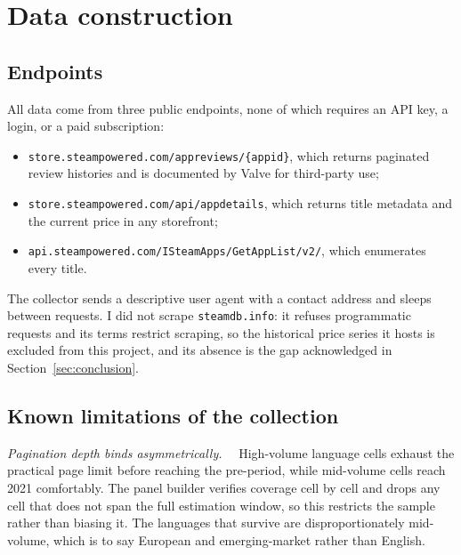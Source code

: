 \documentclass[11pt]{article}
\newcommand{\heading}[1]{\vspace{3pt}\noindent\textit{#1}\ \ }
\begin{document}
\section{Data construction}\label{app:data}

\subsection*{Endpoints}

All data come from three public endpoints, none of which requires an API key, a login, or a paid
subscription:

\begin{itemize}[leftmargin=1.4em,itemsep=2pt,topsep=3pt]
\item \texttt{store.steampowered.com/appreviews/\{appid\}}, which returns paginated review
histories and is documented by Valve for third-party use;
\item \texttt{store.steampowered.com/api/appdetails}, which returns title metadata and the current
price in any storefront;
\item \texttt{api.steampowered.com/ISteamApps/GetAppList/v2/}, which enumerates every title.
\end{itemize}

The collector sends a descriptive user agent with a contact address and sleeps between requests. I
did not scrape \texttt{steamdb.info}: it refuses programmatic requests and its terms restrict
scraping, so the historical price series it hosts is excluded from this project, and its absence is
the gap acknowledged in Section~\ref{sec:conclusion}.

\subsection*{Known limitations of the collection}

\heading{Pagination depth binds asymmetrically.} High-volume language cells exhaust the practical
page limit before reaching the pre-period, while mid-volume cells reach 2021 comfortably. The panel
builder verifies coverage cell by cell and drops any cell that does not span the full estimation
window, so this restricts the sample rather than biasing it. The languages that survive are
disproportionately mid-volume, which is to say European and emerging-market rather than English.
\end{document}
